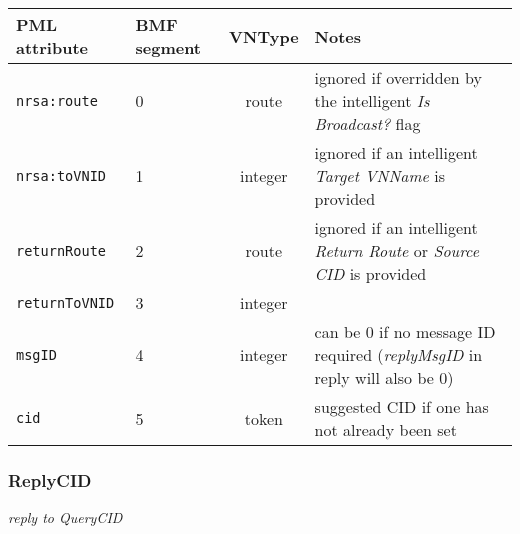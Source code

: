 \documentclass[pdftex,a4paper]{article}
\newcommand{\XMLfont}[1]{{\tt \small #1}}
\begin{document}
\begin{table}[!h]
  \begin{center}
    \label{tab:QueryCID}
    \begin{tabular}{|l|p{13mm}|c|p{60mm}|}
      \hline

      \textbf{PML attribute} & \textbf{BMF segment} & \textbf{VNType}
      & \textbf{Notes} \\\hline

      \XMLfont{nrsa:route} & 0 & route & ignored if overridden by the
      intelligent {\em Is Broadcast?} flag \\\hline

      \XMLfont{nrsa:toVNID} & 1 & integer & ignored if an intelligent {\em
      Target VNName} is provided \\\hline

      \XMLfont{returnRoute} & 2 & route & ignored if an
      intelligent {\em Return Route} or {\em Source CID} is provided
      \\\hline

      \XMLfont{returnToVNID} & 3 & integer & \\\hline

      \XMLfont{msgID} & 4 & integer & can be 0 if no message ID
      required ({\em replyMsgID} in reply will also be 0) \\\hline


      \XMLfont{cid} & 5 & token & suggested CID if one has not
      already been set \\\hline

    \end{tabular}
  \end{center}
\end{table}

\subsubsection{ReplyCID}
{\em reply to QueryCID}
\end{document}
